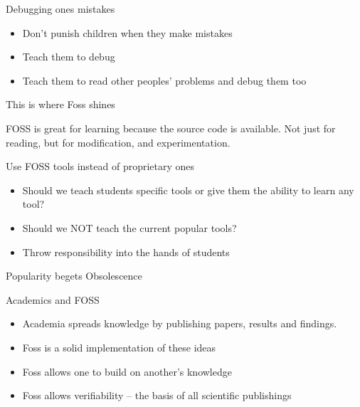 \documentclass{beamer}
\begin{document}
\begin{frame}{Debugging ones mistakes}
   \begin{itemize}
   \item Don't punish children when they make mistakes
   \item Teach them to debug
   \item Teach them to read other peoples' problems and debug them too
   \end{itemize}
\end{frame}

\begin{frame}{This is where Foss shines}
   \begin{block}{}
   \begin{center}
   FOSS is great for learning because the source code is available. Not just for reading, but for modification, and experimentation.
   \end{center}
   \end{block}
\end{frame}

\begin{frame}{Use FOSS tools instead of proprietary ones}
   \begin{itemize}
   \item Should we teach students specific tools or give them the ability to learn any tool?
   \item Should we NOT teach the current popular tools?
   \item Throw responsibility into the hands of students
   \end{itemize}
\end{frame}

\begin{frame}
   \begin{block}{}
   \begin{center}
   Popularity begets Obsolescence
   \end{center}
   \end{block}
\end{frame}

\begin{frame}{Academics and FOSS}
   \begin{itemize}
   \item Academia spreads knowledge by publishing papers, results and findings.
   \item Foss is a solid implementation of these ideas
   \item Foss allows one to build on another's knowledge
   \item Foss allows verifiability -- the basis of all scientific publishings
   \end{itemize}
\end{frame}
\end{document}
